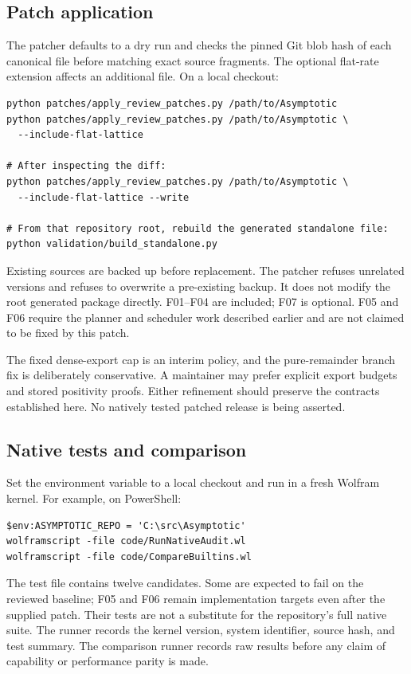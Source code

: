 \documentclass[11pt,letterpaper]{article}
\newcommand{\code}[1]{\texttt{\small\detokenize{#1}}}
\begin{document}
\subsection{Patch application}
The patcher defaults to a dry run and checks the pinned Git blob hash of each canonical file before matching exact source fragments. The optional flat-rate extension affects an additional file. On a local checkout:
\begin{lstlisting}
python patches/apply_review_patches.py /path/to/Asymptotic
python patches/apply_review_patches.py /path/to/Asymptotic \
  --include-flat-lattice

# After inspecting the diff:
python patches/apply_review_patches.py /path/to/Asymptotic \
  --include-flat-lattice --write

# From that repository root, rebuild the generated standalone file:
python validation/build_standalone.py
\end{lstlisting}
Existing sources are backed up before replacement. The patcher refuses unrelated versions and refuses to overwrite a pre-existing backup. It does not modify the root generated package directly. F01--F04 are included; F07 is optional. F05 and F06 require the planner and scheduler work described earlier and are not claimed to be fixed by this patch.

The fixed dense-export cap is an interim policy, and the pure-remainder branch fix is deliberately conservative. A maintainer may prefer explicit export budgets and stored positivity proofs. Either refinement should preserve the contracts established here. No natively tested patched release is being asserted.

\subsection{Native tests and comparison}
Set the environment variable \code{ASYMPTOTIC_REPO} to a local checkout and run \code{code/RunNativeAudit.wl} in a fresh Wolfram kernel. For example, on PowerShell:
\begin{lstlisting}
$env:ASYMPTOTIC_REPO = 'C:\src\Asymptotic'
wolframscript -file code/RunNativeAudit.wl
wolframscript -file code/CompareBuiltins.wl
\end{lstlisting}
The test file contains twelve candidates. Some are expected to fail on the reviewed baseline; F05 and F06 remain implementation targets even after the supplied patch. Their tests are not a substitute for the repository's full native suite. The runner records the kernel version, system identifier, source hash, and test summary. The comparison runner records raw results before any claim of capability or performance parity is made.
\end{document}
